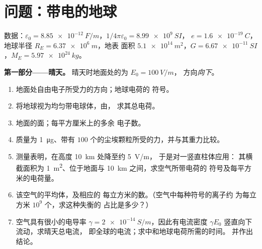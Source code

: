 \section{问题：带电的地球}

\begin{problem}
\label{pb:b1:electrostatics-gauss:1}
数据：$\varepsilon_0 = \qty{8.85e-12}{F/m}$，$1/4\pi\varepsilon_0 = \qty{8.99e9}{SI}$，
$e = \qty{1.6e-19}{C}$，地球半径 $R_E = \qty{6.37e6}{m}$，地表
面积 $\qty{5.1e14}{m^2}$，$G = \qty{6.67e-11}{SI}$，$M_E = \qty{5.97e24}{kg}$。

\medskip
\noindent\textbf{第一部分——晴天。}
晴天时地面处的为 $E_0 = \qty{100}{V/m}$，
方向\emph{向下}。
\begin{enumerate}
  \item 地面处自由电子所受力的方向；地球电荷的
        符号。
  \item 将地球视为均匀带电球体，由，
        求其总电荷。
  \item 地面的面；每平方厘米上的多余
        电子数。
  \item 质量为 \qty{1}{\micro g}、带有 $100$
        个的尘埃颗粒所受的力，并与其重力比较。
  \item 测量表明，在高度 \qty{10}{km} 处降至约 \qty{5}{V/m}，
        于是对一竖直柱体应用：
        其横截面积为 \qty{1}{m^2}、位于地面与 \qty{10}{km} 之间，求空气所带电荷的
        符号及每平方米的电荷量。
  \item 该空气的平均体，及相应的
        每立方米的数。（空气中每种符号的离子约
        为每立方米 $10^9$ 个，求这种失衡的
        占比是多少？）
  \item 空气具有很小的电导率 $\gamma = \qty{2e-14}{S/m}$，因此有电流密度
        $\gamma E_0$ 竖直向下流动，求晴天总电流，
        即全球的电流；求中和地球电荷所需的时间。
        并作出结论。
\end{enumerate}


\end{problem}
